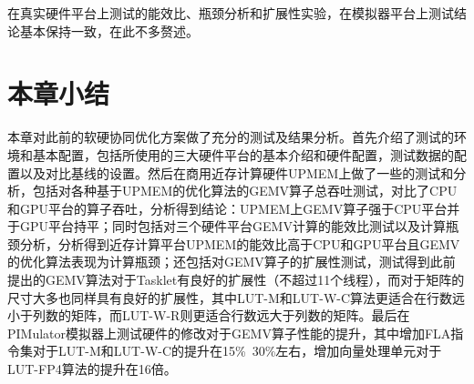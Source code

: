 在真实硬件平台上测试的能效比、瓶颈分析和扩展性实验，在模拟器平台上测试结论基本保持一致，在此不多赘述。

\section{本章小结}
本章对此前的软硬协同优化方案做了充分的测试及结果分析。首先介绍了测试的环境和基本配置，包括所使用的三大硬件平台的基本介绍和硬件配置，测试数据的配置以及对比基线的设置。然后在商用近存计算硬件UPMEM上做了一些的测试和分析，包括对各种基于UPMEM的优化算法的GEMV算子总吞吐测试，对比了CPU和GPU平台的算子吞吐，分析得到结论：UPMEM上GEMV算子强于CPU平台并于GPU平台持平；同时包括对三个硬件平台GEMV计算的能效比测试以及计算瓶颈分析，分析得到近存计算平台UPMEM的能效比高于CPU和GPU平台且GEMV的优化算法表现为计算瓶颈；还包括对GEMV算子的扩展性测试，测试得到此前提出的GEMV算法对于Tasklet有良好的扩展性（不超过11个线程），而对于矩阵的尺寸大多也同样具有良好的扩展性，其中LUT-M和LUT-W-C算法更适合在行数远小于列数的矩阵，而LUT-W-R则更适合行数远大于列数的矩阵。最后在PIMulator模拟器上测试硬件的修改对于GEMV算子性能的提升，其中增加FLA指令集对于LUT-M和LUT-W-C的提升在15\%~30\%左右，增加向量处理单元对于LUT-FP4算法的提升在16倍。